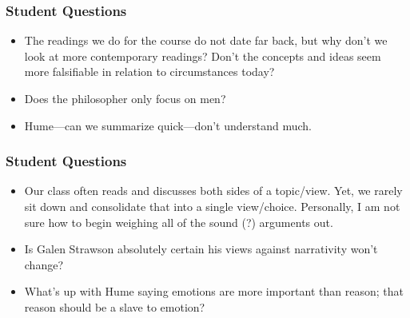 \documentclass[xcolor=dvipsnames]{beamer}
\begin{document}
\begin{frame}
  \frametitle{Student Questions}
  \begin{itemize}
  \item The readings we do for the course do not date far back, but
    why don't we look at more contemporary readings? Don't the
    concepts and ideas seem more falsifiable in relation to
    circumstances today?
  \item Does the philosopher only focus on men?
  \item Hume---can we summarize quick---don't understand much.
  \end{itemize}
\end{frame}

\begin{frame}
  \frametitle{Student Questions}
  \begin{itemize}
  \item Our class often reads and discusses both sides of a
    topic/view. Yet, we rarely sit down and consolidate that into a
    single view/choice. Personally, I am not sure how to begin
    weighing all of the sound (?) arguments out.
  \item Is Galen Strawson absolutely certain his views against
    narrativity won't change?
  \item What's up with Hume saying emotions are more important than
    reason; that reason should be a slave to emotion?
  \end{itemize}
\end{frame}
\end{document}

